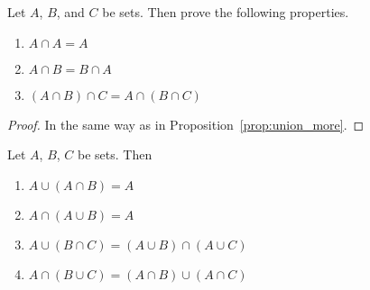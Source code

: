 \documentclass[../main.tex]{subfiles}
\begin{document}
\begin{ex} \label{ex:int_ass}
    Let $A$, $B$, and $C$ be sets.
    Then prove the following properties.
    \begin{enumerate}
        \item $A \cap A = A$
        \item $A \cap B = B \cap A$
        \item $(A \cap B) \cap C = A \cap (B \cap C)$
    \end{enumerate}
\end{ex}
\begin{proof}
    In the same way as in Proposition~\ref{prop:union_more}.
\end{proof}

\begin{prop}
    Let $A$, $B$, $C$ be sets. Then
    \begin{enumerate}
        \item $A \cup (A \cap B) = A$
        \item $A \cap (A \cup B) = A$
        \item $A \cup (B \cap C) = (A \cup B) \cap (A \cup C)$
        \item$A \cap (B \cup C) = (A \cap B) \cup (A \cap C)$
    \end{enumerate}
\end{prop}
\end{document}
